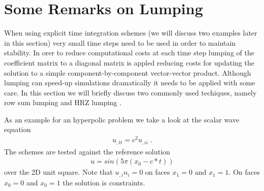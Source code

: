 
%
%
%


\section{Some Remarks on Lumping}
\label{REMARKS ON LUMPING}

When using explicit time integration schemes (we will discuss two examples later in this section)
very small time steps need to be used in order to maintain stability. In orer to reduce 
computational costs at each time step lumping of the coefficient matrix to a diagonal matrix
is appled reducing costs for updating the solution to a simple component-by-component 
vector-vector product. Although lumping can speed-up simulations dramatically
it needs to be applied with some care. In this section we will briefly discuss
two commonly used techiques, namely row sum lumping 
 and HRZ 
lumping .

As an example for an hyperpolic problem we take a look 
at the scalar wave equation
\begin{eqnarray} \label{LUMPING WAVE} 
u_{,tt}=c^2 u_{,ii} \; .
\end{eqnarray}
The schemes are tested against the reference solution
\begin{eqnarray} \label{LUMPING WAVE TEST} 
u=sin(5 \pi (x_0-c*t) )
\end{eqnarray}
over the 2D unit square. Note that $u_{,i}n_i=0$ on faces $x_1=0$ and $x_1=1$.
On faces $x_0=0$ and $x_0=1$ the solution is constraints.


